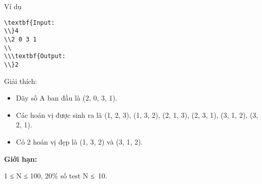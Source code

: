 Ví dụ
\begin{verbatim}
\textbf{Input:
\\}4
\\2 0 3 1
\\
\\\textbf{Output:
\\}2\end{verbatim}
Giải thích:
\begin{itemize}
	\item     Dãy số A ban đầu là (2, 0, 3, 1).   
	\item     Các hoán vị được sinh ra là (1, 2, 3), (1, 3, 2), (2, 1, 3), (2, 3, 1), (3, 1, 2), (3, 2, 1).   
	\item     Có 2 hoán vị đẹp là (1, 3, 2) và (3, 1, 2).   
\end{itemize}
\textbf{    Giới hạn:
}

   1 ≤ N ≤ 100, 20\% số test N ≤ 10.